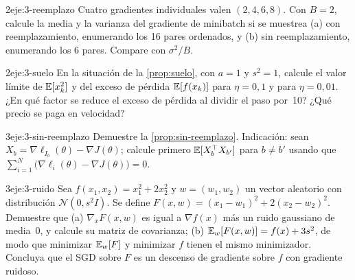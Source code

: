 \begin{ejercicio}{2}{eje:3-reemplazo}
Cuatro gradientes individuales valen $(2,4,6,8)$. Con $B=2$, calcule la media y la varianza del gradiente de minibatch si se muestrea (a) con reemplazamiento, enumerando los 16 pares ordenados, y (b) sin reemplazamiento, enumerando los 6 pares. Compare con $\sigma^{2}/B$.
\end{ejercicio}

\begin{ejercicio}{2}{eje:3-suelo}
En la situación de la \cref{prop:suelo}, con $a=1$ y $s^{2}=1$, calcule el valor límite de $\mathbb{E}[x_k^{2}]$ y del exceso de pérdida $\mathbb{E}[f(x_k)]$ para $\eta=0{,}1$ y para $\eta=0{,}01$. ¿En qué factor se reduce el exceso de pérdida al dividir el paso por~10? ¿Qué precio se paga en velocidad?
\end{ejercicio}

\begin{ejercicio}{3}{eje:3-sin-reemplazo}
Demuestre la \cref{prop:sin-reemplazo}. Indicación: sean $X_b=\nabla\ell_{I_b}(\theta)-\nabla J(\theta)$; calcule primero $\mathbb{E}[X_b^{\top} X_{b'}]$ para $b\ne b'$ usando que $\sum_{i=1}^{N}\bigl(\nabla\ell_i(\theta)-\nabla J(\theta)\bigr)=0$.
\end{ejercicio}

\begin{ejercicio}{3}{eje:3-ruido}
Sea $f(x_1,x_2)=x_1^{2}+2x_2^{2}$ y $w=(w_1,w_2)$ un vector aleatorio con distribución $\mathcal{N}(0,s^{2}I)$. Se define $F(x,w)=(x_1-w_1)^{2}+2(x_2-w_2)^{2}$. Demuestre que (a) $\nabla_xF(x,w)$ es igual a $\nabla f(x)$ más un ruido gaussiano de media~0, y calcule su matriz de covarianza; (b) $\mathbb{E}_w[F(x,w)]=f(x)+3s^{2}$, de modo que minimizar $\mathbb{E}_w[F]$ y minimizar $f$ tienen el mismo minimizador. Concluya que el SGD sobre $F$ es un descenso de gradiente sobre $f$ con gradiente ruidoso.
\end{ejercicio}
